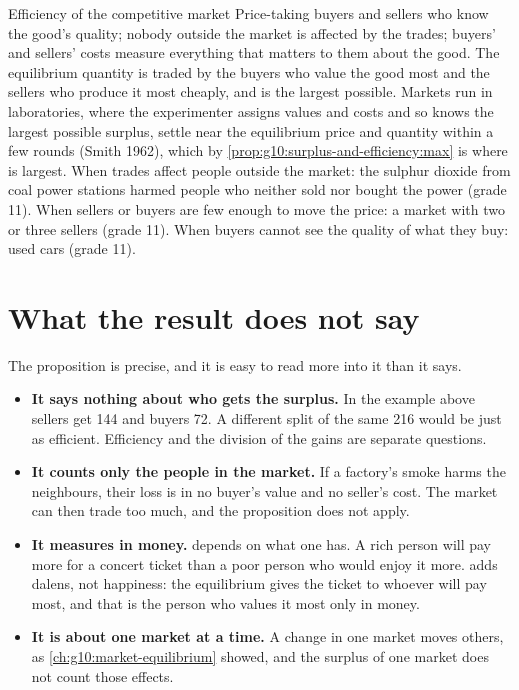 \begin{model}{Efficiency of the competitive market}
\assumes Price-taking buyers and sellers who know the good's quality; nobody outside the market is affected by the trades; buyers'  and sellers' costs measure everything that matters to them about the good.
\predicts The equilibrium quantity is traded by the buyers who value the good most and the sellers who produce it most cheaply, and  is
  the largest possible.
\tested Markets run in laboratories, where the experimenter assigns values and costs and so knows the largest possible surplus, settle near the
  equilibrium price and quantity within a few rounds (Smith 1962), which by \cref{prop:g10:surplus-and-efficiency:max} is where  is largest.
\breaks When trades affect people outside the market: the sulphur dioxide from coal power stations harmed people who neither sold nor bought
  the power (grade 11). When sellers or buyers are few enough to move the price: a market with two or three sellers (grade 11). When buyers cannot see
  the quality of what they buy: used cars (grade 11).
\end{model}

\section{What the result does not say}\label{sec:g10:surplus-and-efficiency:limits}

The proposition is precise, and it is easy to read more into it than it says.

\begin{itemize}
\item \textbf{It says nothing about who gets the surplus.} In the example above sellers get 144 and buyers 72. A different split of the same 216 would be
  just as efficient. Efficiency and the division of the gains are separate questions.
\item \textbf{It counts only the people in the market.} If a factory's smoke harms the neighbours, their loss is in no buyer's value and no seller's cost.
  The market can then trade too much, and the proposition does not apply.
\item \textbf{It measures in money.}  depends on what one has. A rich person will pay more for a concert ticket than a poor person who
  would enjoy it more.  adds dalens, not happiness: the equilibrium gives the ticket to whoever will pay most, and that is the person who
  values it most only in money.
\item \textbf{It is about one market at a time.} A change in one market moves others, as \cref{ch:g10:market-equilibrium} showed, and the surplus
  of one market does not count those effects.
\end{itemize}

